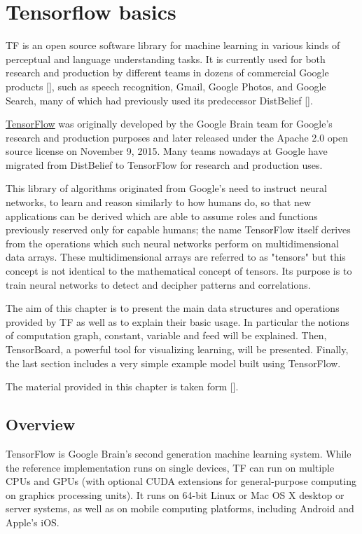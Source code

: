 \chapter{Tensorflow basics}\label{ch:tensorflow_basics}

\ac{TF} is an open source software library for machine learning in various kinds of perceptual and language understanding tasks. It is currently used for both research and production by different teams in dozens of commercial Google products [\cite{DBLP:journals/corr/AbadiABBCCCDDDG16}], such as speech recognition, Gmail, Google Photos, and Google Search, many of which had previously used its predecessor DistBelief [\cite{40565}]. 

\href{https://www.tensorflow.org/}{TensorFlow} was originally developed by the Google Brain team for Google's research and production purposes and later released under the Apache 2.0 open source license on November 9, 2015.  Many teams nowadays at Google have migrated from DistBelief to TensorFlow for research and production uses.

This library of algorithms originated from Google's need to instruct neural networks, to learn and reason similarly to how humans do, so that new applications can be derived which are able to assume roles and functions previously reserved only for capable humans; the name TensorFlow itself derives from the operations which such neural networks perform on multidimensional data arrays. These multidimensional arrays are referred to as "tensors" but this concept is not identical to the mathematical concept of tensors. Its purpose is to train neural networks to detect and decipher patterns and correlations.

The aim of this chapter is to present the main data structures and operations provided by \acs{TF} as well as to explain their basic usage. In particular the notions of computation graph, constant, variable and feed will be explained. Then, TensorBoard, a powerful tool for visualizing learning, will be presented. Finally, the last section includes a very simple example model built using TensorFlow.

The material provided in this chapter is taken form [\cite{tensorflow}].

\section{Overview}

TensorFlow is Google Brain's second generation machine learning system. While the reference implementation runs on single devices, \ac{TF} can run on multiple \acsp{CPU} and \acsp{GPU} (with optional \acs{CUDA} extensions for general-purpose computing on graphics processing units). It runs on 64-bit Linux or Mac OS X desktop or server systems, as well as on mobile computing platforms, including Android and Apple's iOS.

